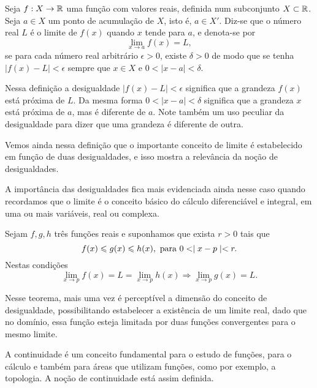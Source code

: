 \documentclass[glenn,refnum,codigo]{Estilo}
\begin{document}
\begin{define}[Limite]
	Seja $f: X \rightarrow \mathbb{R}$ uma função com valores reais, definida num
	subconjunto $X \subset \mathbb{R}$.
	Seja $a \in X$ um ponto de acumulação de $X$, isto é, $a \in X'$.
	Diz-se que o número real $L$ é o limite de $f(x)$ quando $x$ tende para $a$, e
	denota-se por
	\[
	\lim_{x \rightarrow a} f(x) = L,
	\]
	se para cada número real arbitrário $\epsilon > 0$, existe $\delta > 0$ de modo
	que se tenha
	$\mid f(x) - L\mid < \epsilon$ sempre que $x \in X$ e $0 < \mid x - a \mid <
	\delta$.
\end{define}

Nessa definição a desigualdade $\mid f(x) - L\mid < \epsilon$ significa que a
grandeza $f(x)$ está próxima de $L$. Da mesma forma $0 < \mid x - a \mid <
\delta$ significa que a grandeza $x$ está próxima de $a$, mas é diferente de
$a$. Note também um uso peculiar da desigualdade para dizer que uma grandeza é
diferente de outra.

Vemos ainda nessa definição que o importante conceito de limite é estabelecido
em função de duas desigualdades, e isso mostra a relevância da noção de
desigualdades.

A importância das desigualdades fica mais evidenciada ainda nesse caso quando
recordamos que o limite é o conceito básico do cálculo diferenciável e integral,
em uma ou mais variáveis, real ou complexa.


\begin{teorema}[Confronto]
	Sejam $f, g, h$ três funções reais e suponhamos que exista $r > 0$ tais que
	\[
	f(x) \leqslant g(x) \leqslant h(x),\,\,\hbox{para}\,\,0 < \mid x - p \mid < r.
	\]
	Nestas condições
	\[
	\lim_{x \rightarrow p} f(x) = L = \lim_{x \to p} h(x) \Longrightarrow
	\lim_{x \rightarrow p} g(x) = L.
	\]
\end{teorema}

Nesse teorema, mais uma vez é perceptível a dimensão do conceito de
desigualdade, possibilitando estabelecer a existência de um limite real, dado
que no domínio, essa função esteja limitada por duas funções convergentes para o
mesmo limite.

A continuidade é um conceito fundamental para o estudo de funções, para o
cálculo e também para áreas que utilizam funções, como por exemplo, a topologia.
A noção de continuidade está assim definida.
\end{document}
